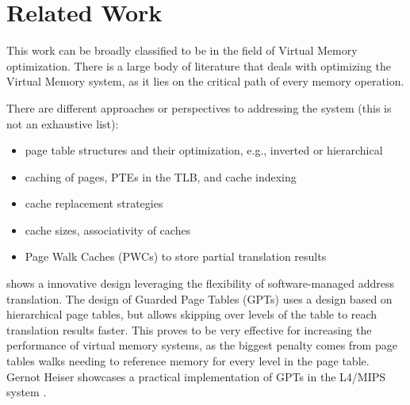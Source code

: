 \chapter{Related Work}

\label{chap:related}
This work can be broadly classified to be in the field of Virtual Memory optimization. There is a large body of literature that deals with optimizing the Virtual Memory system, as it lies on the critical path of every memory operation.

There are different approaches or perspectives to addressing the system (this is not an exhaustive list):

\begin{itemize}
    \item page table structures and their optimization, e.g., inverted or hierarchical
    \item caching of pages, PTEs in the TLB, and cache indexing
    \item cache replacement strategies
    \item cache sizes, associativity of caches
    \item Page Walk Caches (PWCs) to store partial translation results
\end{itemize}



\textbf{\cite{liedtkeGPT}} shows a innovative design leveraging the flexibility of software-managed
address translation.
The design of Guarded Page Tables (GPTs) uses a design based on hierarchical page tables, but allows skipping over levels of the table to reach translation results faster.
This proves to be very effective for increasing the performance of virtual memory systems, as the biggest penalty comes from page tables walks needing to reference memory for every level in the page table.
Gernot Heiser showcases a practical implementation of GPTs in the L4/MIPS system \cite{heiserAnatomyHighPerformanceMicrokernel}.





